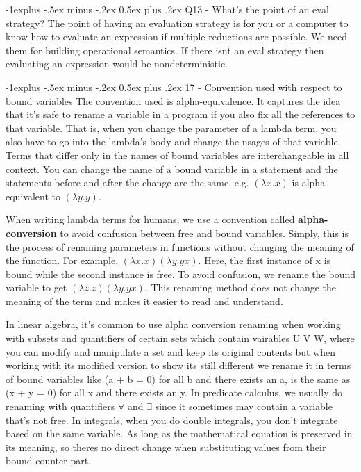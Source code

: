 \documentclass[letterpaper, 8pt]{extarticle}
\makeatletter
\renewcommand{\subsection}{\@startsection{subsection}{2}{0mm}%
                                {-1explus -.5ex minus -.2ex}%
                                {0.5ex plus .2ex}%
                                {\normalfont\small\bfseries}}
\makeatother
\begin{document}
\begin{multicols*}{4}
    \subsection{Q13 - What's the point of an eval strategy?}
    The point of having an evaluation strategy is for you or a computer to know how to evaluate an
    expression if multiple reductions are possible. We need them for building operational semantics. If
    there isnt an eval strategy then evaluating an expression would be nondeterministic.

    \subsection{17 - Convention used with respect to bound variables}
    The convention used is alpha-equivalence. It captures the idea that it's safe to rename a variable in
    a program if you also fix all the references to that variable. That is, when you change the parameter
    of a lambda term, you also have to go into the lambda's body and change the usages of that variable.
    Terms that differ only in the names of bound variables are interchangeable in all context.
    You can change the name of a bound variable in a statement and
    the statements before and after the change are the same. e.g. $(\lambda x.x)$ is alpha equivalent to
    $(\lambda y.y)$.

    When writing lambda terms for humans, we use a convention called \textbf{alpha-conversion} to avoid confusion between free and bound variables. Simply, this is the process of renaming parameters in functions without changing the meaning of the function. For example, $(\lambda x.x)( \lambda y.yx)$. Here, the first instance of x is bound while the second instance is free. To avoid confusion, we rename the bound variable to get $(\lambda z.z)( \lambda y.yx)$. This renaming method does not change the meaning of the term and makes it easier to read and understand.

    In linear algebra, it's common to use alpha conversion renaming when working with subsets and quantifiers of certain sets which contain vairables U V W, where you can modify and manipulate a set and keep its original contents but when working with its modified version to show its still different we rename it in terms of bound variables like (a + b = 0) for all b and there exists an a, is the same as (x + y = 0) for all x and there exists an y. In predicate calculus, we usually do renaming with quantifiers $\forall$ and $\exists$ since it sometimes may contain a variable that's not free. In integrals, when you do double integrals, you don't integrate based on the same variable. As long as the mathematical equation is preserved in its meaning, so theres no direct change when substituting values from their bound counter part.


\end{multicols*}
\end{document}
